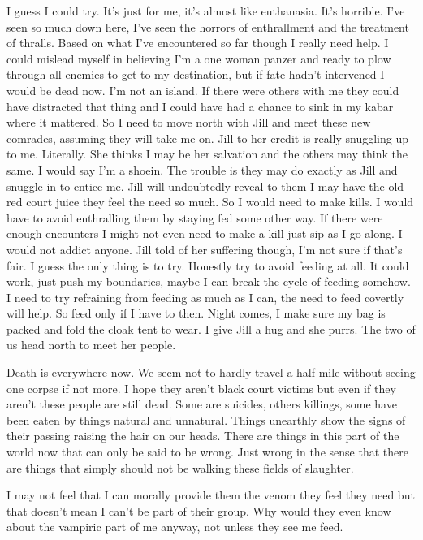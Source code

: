 I guess I could try. It's just for me, it's almost like euthanasia. It's horrible. I've seen so much down here, I've seen the horrors of enthrallment and the treatment of thralls. 
Based on what I've encountered so far though I really need help. I could mislead myself in believing I'm a one woman panzer and ready to plow through all enemies to get to my destination, but if fate hadn't intervened I would be dead now. I'm not an island. If there were others with me they could have distracted that thing and I could have had a chance to sink in my kabar where it mattered.
So I need to move north with Jill and meet these new comrades, assuming they will take me on.
Jill to her credit is really snuggling up to me. Literally. She thinks I may be her salvation and the others may think the same. I would say I'm a shoein.
The trouble is they may do exactly as Jill and snuggle in to entice me. Jill will undoubtedly reveal to them I may have the old red court juice they feel the need so much.
So I would need to make kills. I would have to avoid enthralling them by staying fed some other way. If there were enough encounters I might not even need to make a kill just sip as I go along. I would not addict anyone.
Jill told of her suffering though, I'm not sure if that's fair.
I guess the only thing is to try. Honestly try to avoid feeding at all. It could work, just push my boundaries, maybe I can break the cycle of feeding somehow.
I need to try refraining from feeding as much as I can, the need to feed covertly will help.
So feed only if I have to then.
Night comes, I make sure my bag is packed and fold the cloak tent to wear. I give Jill a hug and she purrs. The two of us head north to meet her people.

Death is everywhere now. We seem not to hardly travel a half mile without seeing one corpse if not more. I hope they aren't black court victims but even if they aren't these people are still dead. Some are suicides, others killings, some have been eaten by things natural and unnatural. Things unearthly show the signs of their passing raising the hair on our heads. There are things in this part of the world now that can only be said to be wrong. Just wrong in the sense that there are things that simply should not be walking these fields of slaughter. 

I may not feel that I can morally provide them the venom they feel they need but that doesn't mean I can't be part of their group. Why would they even know about the vampiric part of me anyway, not unless they see me feed. 

